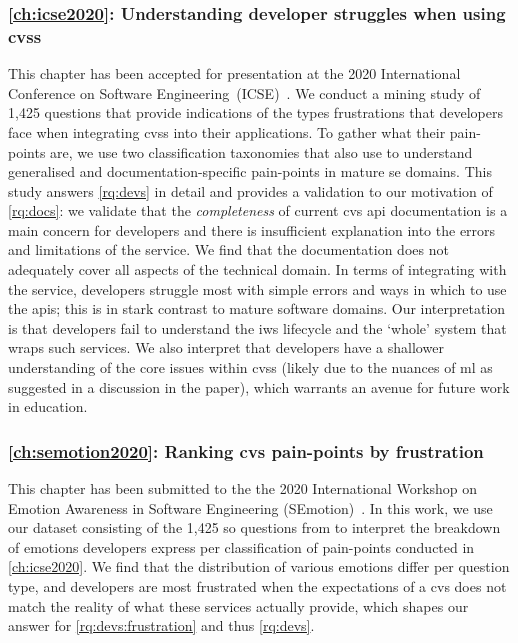 \subsubsection{\cref{ch:icse2020}: Understanding developer struggles when using \glspl{cvs}} This chapter has been accepted for presentation at the 2020 International Conference on Software Engineering~(ICSE)~\citep{Cummaudo:2020icse}. We conduct a mining study of 1,425  questions that provide indications of the types frustrations that developers face when integrating \glspl{cvs} into their applications. To gather what their pain-points are, we use two classification taxonomies that also use  to understand generalised and documentation-specific pain-points in mature \gls{se} domains. This study answers \ref{rq:devs} in detail and provides a validation to our motivation of \ref{rq:docs}: we validate that the \textit{completeness} of current \gls{cvs} \gls{api} documentation is a main concern for developers and there is insufficient explanation into the errors and limitations of the service. We find that the documentation does not adequately cover all aspects of the technical domain. In terms of integrating with the service, developers struggle most with simple errors and ways in which to use the \glspl{api}; this is in stark contrast to mature software domains. Our interpretation is that developers fail to understand the \gls{iws} lifecycle and the `whole' system that wraps such services. We also interpret that developers have a shallower understanding of the core issues within \glspl{cvs} (likely due to the nuances of \gls{ml} as suggested in a discussion in the paper), which warrants an avenue for future work in  education.

\subsubsection{\cref{ch:semotion2020}: Ranking \gls{cvs} pain-points by frustration} This chapter has been submitted to the the 2020 International Workshop on Emotion Awareness in Software Engineering (SEmotion)~\citep{Curumsing:2020semotion}. In this work, we use our dataset consisting of the 1,425 \gls{so} questions from \citep{Cummaudo:2020icse} to interpret the breakdown of emotions developers express per classification of pain-points conducted in \cref{ch:icse2020}. We find that the distribution of various emotions differ per question type, and developers are most frustrated when the expectations of a \gls{cvs} does not match the reality of what these services actually provide, which shapes our answer for \ref{rq:devs:frustration} and thus \ref{rq:devs}.

